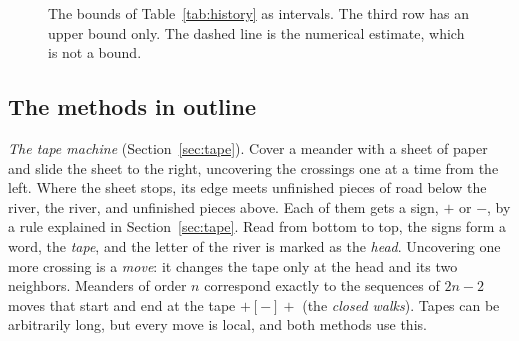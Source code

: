 \begin{figure}[htb]
\centering
{}
\caption{The bounds of Table~\ref{tab:history} as intervals. The third row has an upper bound only. The dashed line is the
numerical estimate, which is not a bound.}
\label{fig:history}
\end{figure}

\subsection{The methods in outline}

\emph{The tape machine} (Section~\ref{sec:tape}). Cover a meander with a sheet of paper and slide the sheet to the
right, uncovering the crossings one at a time from the left. Where the sheet stops, its edge meets unfinished pieces of
road below the river, the river, and unfinished pieces above. Each of them gets a sign, $+$ or $-$, by a rule
explained in Section~\ref{sec:tape}. Read from bottom to top, the signs form a word, the \emph{tape}, and the letter
of the river is marked as the \emph{head}. Uncovering one more crossing is a \emph{move}: it changes the tape only at
the head and its two neighbors. Meanders of order $n$ correspond exactly to the sequences of $2n-2$ moves that start
and end at the tape $+[-]+$ (the \emph{closed walks}). Tapes can be arbitrarily long, but every move is local, and both
methods use this.

